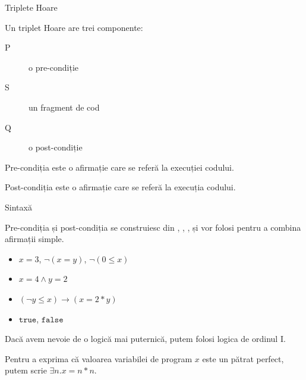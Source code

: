\begin{frame}{Triplete Hoare}

Un \alert{triplet Hoare}   are trei componente:
\begin{description}
	\item[P] o \alert{pre-condiție}
	\item[S] un \alert{fragment de cod}
	\item[Q] o \alert{post-condiție}
\end{description}

\alert{Pre-condiția} este o afirmație care se referă la  execuției codului.

\alert{Post-condiția} este o afirmație care se referă la  execuția codului.

\end{frame}

\begin{frame}{Sintaxă}

\alert{Pre-condiția} și \alert{post-condiția} se construiesc din , , , și vor folosi  pentru a combina afirmații simple.

\begin{example}
\begin{itemize}
	\item $x = 3$, $\neg (x = y)$, $\neg (0 \leq x)$
	\item $x = 4 \wedge y = 2$
	\item $(\neg y \leq x) \to (x = 2 * y)$
	\item $\texttt{true}$, $\texttt{false}$
\end{itemize}
\end{example}

Dacă avem nevoie de o logică mai puternică, putem folosi \alert{logica de ordinul I}.
\begin{example}
Pentru a exprima că valoarea variabilei de program $x$ este un pătrat perfect,
putem scrie $\exists n. x = n * n$.
\end{example}

\end{frame}

